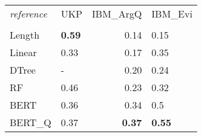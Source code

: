 \begin{tabular}{llrl}
\toprule
\textit{reference} &   UKP &  IBM\_ArgQ & IBM\_Evi \\
  &       &           &         \\
\midrule
Length &  \textbf{0.59} &      0.14 &    0.15 \\
Linear &  0.33 &      0.17 &    0.35 \\
DTree  &     - &      0.20 &    0.24 \\
RF     &  0.46 &      0.23 &    0.32 \\
BERT   &  0.36 &      0.34 &     0.5 \\
BERT\_Q &  0.37 &      \textbf{0.37} &    \textbf{0.55} \\
\bottomrule
\end{tabular}
